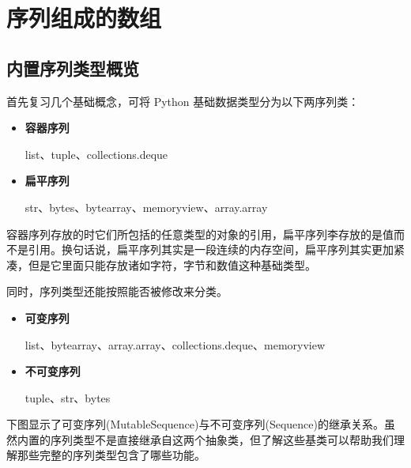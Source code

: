 \section{序列组成的数组}
\subsection{内置序列类型概览}

首先复习几个基础概念，可将 Python 基础数据类型分为以下两序列类：

\begin{itemize}
    \item \textbf{容器序列}
    
    list、tuple、collections.deque
    \item \textbf{扁平序列}
    
    str、bytes、bytearray、memoryview、array.array
\end{itemize}

容器序列存放的时它们所包括的任意类型的对象的引用，扁平序列李存放的是值而不是引用。换句话说，扁平序列其实是一段连续的内存空间，扁平序列其实更加紧凑，但是它里面只能存放诸如字符，字节和数值这种基础类型。

同时，序列类型还能按照能否被修改来分类。

\begin{itemize}
    \item \textbf{可变序列}
    
    list、bytearray、array.array、collections.deque、memoryview

    \item \textbf{不可变序列}
    
    tuple、str、bytes
\end{itemize}

下图显示了可变序列(MutableSequence)与不可变序列(Sequence)的继承关系。虽然内置的序列类型不是直接继承自这两个抽象类，但了解这些基类可以帮助我们理解那些完整的序列类型包含了哪些功能。

